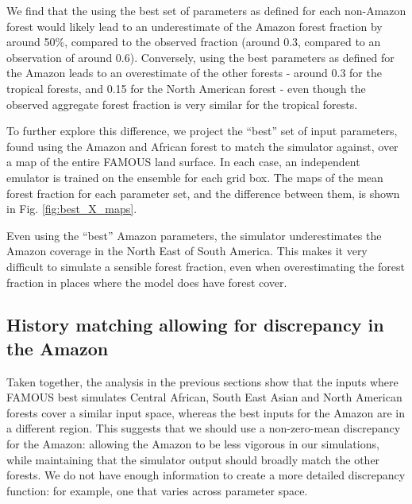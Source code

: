 \documentclass[esd, article]{copernicus} %
\begin{document}
We find that the using the best set of parameters as defined for each non-Amazon forest would likely lead to an underestimate of the Amazon forest fraction by around 50\%, compared to the observed fraction (around 0.3, compared to an observation of around 0.6). Conversely, using the best parameters as defined for the Amazon leads to an overestimate of the other forests - around 0.3 for the tropical forests, and 0.15 for the North American forest - even though the observed aggregate forest fraction is very similar for the tropical forests.


To further explore this difference, we project the ``best'' set of input parameters, found using the Amazon and African forest to match the simulator against, over a map of the entire FAMOUS land surface. In each case, an independent emulator is trained on the ensemble for each grid box. The maps of the mean forest fraction for each parameter set, and the difference between them, is shown in Fig.  \ref{fig:best_X_maps}.

Even using the ``best'' Amazon parameters, the simulator underestimates the Amazon coverage in the North East of South America. This makes it very difficult to simulate a sensible forest fraction, even when overestimating the forest fraction in places where the model does have forest cover.

\subsection{History matching allowing for discrepancy in the Amazon}\label{ssec:hist_disc}

Taken together, the analysis in the previous sections show that the inputs where FAMOUS best simulates Central African, South East Asian and North American forests cover a similar input space, whereas the best inputs for the Amazon are in a different region. This suggests that we should use a non-zero-mean discrepancy for the Amazon: allowing the Amazon to be less vigorous in our simulations, while maintaining that the simulator output should broadly match the other forests. We do not have enough information to create a more detailed discrepancy function: for example, one that varies across parameter space.
\end{document}
